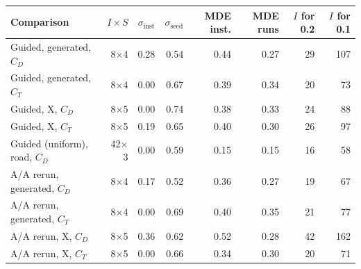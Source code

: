 \begin{tabular}{lrrrrrrr}
\toprule
Comparison & $I\times S$ & $\sigma_{\mathrm{inst}}$ & $\sigma_{\mathrm{seed}}$ & MDE inst. & MDE runs & $I$ for 0.2 & $I$ for 0.1 \\
\midrule
Guided, generated, $C_D$ & 8$\times$4 & 0.28 & 0.54 & 0.44 & 0.27 & 29 & 107 \\
Guided, generated, $C_T$ & 8$\times$4 & 0.00 & 0.67 & 0.39 & 0.34 & 20 & 73 \\
Guided, X, $C_D$ & 8$\times$5 & 0.00 & 0.74 & 0.38 & 0.33 & 24 & 88 \\
Guided, X, $C_T$ & 8$\times$5 & 0.19 & 0.65 & 0.40 & 0.30 & 26 & 97 \\
Guided (uniform), road, $C_D$ & 42$\times$3 & 0.00 & 0.59 & 0.15 & 0.15 & 16 & 58 \\
A/A rerun, generated, $C_D$ & 8$\times$4 & 0.17 & 0.52 & 0.36 & 0.27 & 19 & 67 \\
A/A rerun, generated, $C_T$ & 8$\times$4 & 0.00 & 0.69 & 0.40 & 0.35 & 21 & 77 \\
A/A rerun, X, $C_D$ & 8$\times$5 & 0.36 & 0.62 & 0.52 & 0.28 & 42 & 162 \\
A/A rerun, X, $C_T$ & 8$\times$5 & 0.00 & 0.66 & 0.34 & 0.30 & 20 & 71 \\
\bottomrule
\end{tabular}
